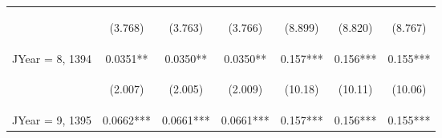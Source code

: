 \documentclass{standalone}
\begin{document}
\begin{tabular}{lcccccc}
    \vspace{4pt}     & \begin{footnotesize}(3.768)\end{footnotesize}   & \begin{footnotesize}(3.763)\end{footnotesize}   & \begin{footnotesize}(3.766)\end{footnotesize}   & \begin{footnotesize}(8.899)\end{footnotesize}  & \begin{footnotesize}(8.820)\end{footnotesize}  & \begin{footnotesize}(8.767)\end{footnotesize}  \\
    JYear = 8, 1394  & 0.0351**                                        & 0.0350**                                        & 0.0350**                                        & 0.157***                                       & 0.156***                                       & 0.155***                                       \\
    \vspace{4pt}     & \begin{footnotesize}(2.007)\end{footnotesize}   & \begin{footnotesize}(2.005)\end{footnotesize}   & \begin{footnotesize}(2.009)\end{footnotesize}   & \begin{footnotesize}(10.18)\end{footnotesize}  & \begin{footnotesize}(10.11)\end{footnotesize}  & \begin{footnotesize}(10.06)\end{footnotesize}  \\
    JYear = 9, 1395  & 0.0662***                                       & 0.0661***                                       & 0.0661***                                       & 0.157***                                       & 0.156***                                       & 0.155***                                       \\

\end{tabular}
\end{document}
